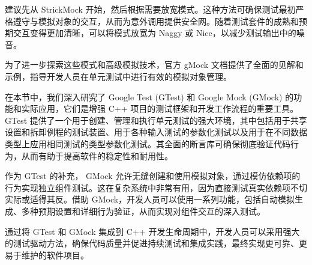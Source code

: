 建议先从 StrickMock 开始，然后根据需要放宽模式。这种方法可确保测试最初严格遵守与模拟对象的交互，从而为意外调用提供安全网。随着测试套件的成熟和预期交互变得更加清晰，可以将模式放宽为 Naggy 或 Nice，以减少测试输出中的噪音。

为了进一步探索这些模式和高级模拟技术，官方 gMock 文档提供了全面的见解和示例，指导开发人员在单元测试中进行有效的模拟对象管理。

在本节中，我们深入研究了 Google Test (GTest) 和 Google Mock (GMock) 的功能和实际应用，它们是增强 C++ 项目的测试框架和开发工作流程的重要工具。 GTest 提供了一个用于创建、管理和执行单元测试的强大环境，其中包括用于共享设置和拆卸例程的测试装置、用于各种输入测试的参数化测试以及用于在不同数据类型上应用相同测试的类型参数化测试。其全面的断言库可确保彻底验证代码行为，从而有助于提高软件的稳定性和耐用性。

作为 GTest 的补充， GMock 允许无缝创建和使用模拟对象，通过模仿依赖项的行为实现独立组件测试。这在复杂系统中非常有用，因为直接测试真实依赖项不切实际或适得其反。借助 GMock，开发人员可以使用一系列功能，包括自动模拟生成、多种预期设置和详细行为验证，从而实现对组件交互的深入测试。

通过将 GTest 和 GMock 集成到 C++ 开发生命周期中，开发人员可以采用强大的测试驱动方法，确保代码质量并促进持续测试和集成实践，最终实现更可靠、更易于维护的软件项目。





















